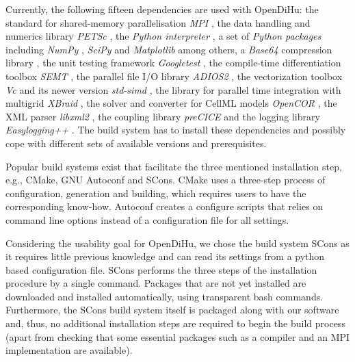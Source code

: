 Currently, the following fifteen dependencies are used with OpenDiHu: the standard for shared-memory parallelisation \emph{MPI} \cite{openmpi}, the data handling and numerics library \emph{PETSc} \cite{petsc-efficient1997,petsc-user-ref,petsc-web-page}, the \emph{Python interpreter} \cite{python3}, a set of \emph{Python packages} including \emph{NumPy} \cite{numpy}, \emph{SciPy} \cite{scipy} and \emph{Matplotlib} \cite{matplotlib} among others, a \emph{Base64} compression library \cite{base64}, the unit testing framework \emph{Googletest} \cite{googletest}, the compile-time differentiation toolbox \emph{SEMT} \cite{gutterman2004symbolic,semt}, the parallel file I/O library \emph{ADIOS2} \cite{adios2}, the vectorization toolbox \emph{Vc} \cite{vc2012,Kretz2015} and its newer version \emph{std-simd} \cite{hoberock2016working}, the library for parallel time integration with multigrid \emph{XBraid} \cite{xbraid-package}, the solver and converter for CellML models \emph{OpenCOR} \cite{OpenCOR2015}, the XML parser \emph{libxml2} \cite{libxml2}, the coupling library \emph{preCICE} \cite{precice} and the logging library \emph{Easylogging++} \cite{easyloggingpp}. The build system has to install these dependencies and possibly cope with different sets of available versions and prerequisites.


Popular build systems exist that facilitate the three mentioned installation step, e.g., CMake, GNU Autoconf and SCons. CMake uses a three-step process of configuration, generation and building, which requires users to have the corresponding know-how. Autoconf creates a configure scripts that relies on command line options instead of a configuration file for all settings. 

Considering the usability goal for OpenDiHu, we chose the build system SCons as it requires little previous knowledge and can read its settings from a python based configuration file. SCons performs the three steps of the installation procedure by a single command. Packages that are not yet installed are downloaded and installed automatically, using transparent bash commands.
Furthermore, the SCons build system itself is packaged along with our software and, thus, no additional installation steps are required to begin the build process (apart from checking that some essential packages such as a compiler and an MPI implementation are available).


